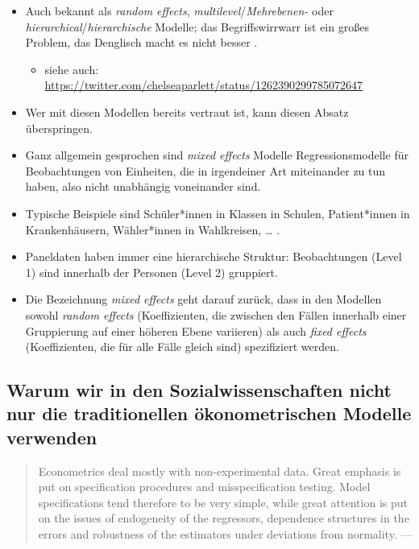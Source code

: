 \documentclass[
]{book}
\providecommand{\tightlist}{%
  \setlength{\itemsep}{0pt}\setlength{\parskip}{0pt}}
\begin{document}
\begin{itemize}
\item
  Auch bekannt als \emph{random effects}, \emph{multilevel}/\emph{Mehrebenen-} oder \emph{hierarchical}/\emph{hierarchische} Modelle; das Begriffswirrwarr ist ein großes Problem, das Denglisch macht es nicht besser \citep{gelmanDataAnalysisUsing2006}.

  \begin{itemize}
  \tightlist
  \item
    siehe auch: \url{https://twitter.com/chelseaparlett/status/1262390299785072647}
  \end{itemize}
\item
  Wer mit diesen Modellen bereits vertraut ist, kann diesen Absatz überspringen.
\item
  Ganz allgemein gesprochen sind \emph{mixed effects} Modelle Regressionsmodelle für Beobachtungen von Einheiten, die in irgendeiner Art miteinander zu tun haben, also nicht unabhängig voneinander sind.
\item
  Typische Beispiele sind Schüler*innen in Klassen in Schulen, Patient*innen in Krankenhäusern, Wähler*innen in Wahlkreisen, \ldots{} .
\item
  Paneldaten haben immer eine hierarchische Struktur: Beobachtungen (Level 1) sind innerhalb der Personen (Level 2) gruppiert.
\item
  Die Bezeichnung \emph{mixed effects} geht darauf zurück, dass in den Modellen sowohl \emph{random effects} (Koeffizienten, die zwischen den Fällen innerhalb einer Gruppierung auf einer höheren Ebene variieren) als auch \emph{fixed effects} (Koeffizienten, die für alle Fälle gleich sind) spezifiziert werden.
\end{itemize}

\hypertarget{warum-wir-in-den-sozialwissenschaften-nicht-nur-die-traditionellen-uxf6konometrischen-modelle-verwenden}{%
\subsection*{Warum wir in den Sozialwissenschaften nicht nur die traditionellen ökonometrischen Modelle verwenden}\label{warum-wir-in-den-sozialwissenschaften-nicht-nur-die-traditionellen-uxf6konometrischen-modelle-verwenden}}

\begin{quote}
Econometrics deal mostly with non-experimental data. Great emphasis is put on specification procedures and misspecification testing. Model specifications tend therefore to be very simple, while great attention is put on the issues of endogeneity of the regressors, dependence structures in the errors and robustness of the estimators under deviations from normality. --- \citet{plm2008}
\end{quote}
\end{document}
